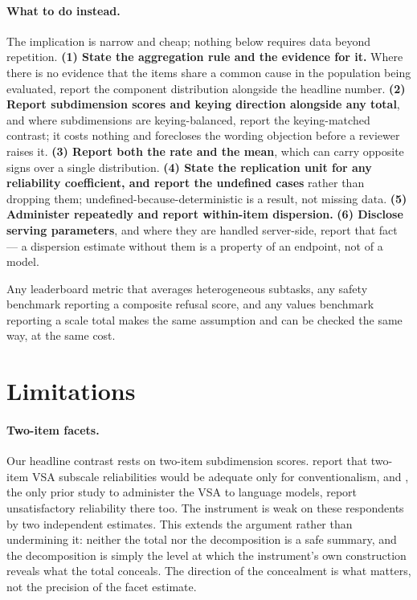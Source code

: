 \documentclass{article}
\begin{document}
\paragraph{What to do instead.} The implication is narrow and cheap; nothing below requires data beyond repetition. \textbf{(1) State the aggregation rule and the evidence for it.} Where there is no evidence that the items share a common cause in the population being evaluated, report the component distribution alongside the headline number. \textbf{(2) Report subdimension scores and keying direction alongside any total}, and where subdimensions are keying-balanced, report the keying-matched contrast; it costs nothing and forecloses the wording objection before a reviewer raises it. \textbf{(3) Report both the rate and the mean}, which can carry opposite signs over a single distribution. \textbf{(4) State the replication unit for any reliability coefficient, and report the undefined cases} rather than dropping them; undefined-because-deterministic is a result, not missing data. \textbf{(5) Administer repeatedly and report within-item dispersion.} \textbf{(6) Disclose serving parameters}, and where they are handled server-side, report that fact --- a dispersion estimate without them is a property of an endpoint, not of a model.

Any leaderboard metric that averages heterogeneous subtasks, any safety benchmark reporting a composite refusal score, and any values benchmark reporting a scale total makes the same assumption and can be checked the same way, at the same cost.

\section{Limitations}
\label{sec:limitations}

\paragraph{Two-item facets.} Our headline contrast rests on two-item subdimension scores. \citet{bizumic2018} report that two-item VSA subscale reliabilities would be adequate only for conventionalism, and \citet{einwiller2026}, the only prior study to administer the VSA to language models, report unsatisfactory reliability there too. The instrument is weak on these respondents by two independent estimates. This extends the argument rather than undermining it: neither the total nor the decomposition is a safe summary, and the decomposition is simply the level at which the instrument's own construction reveals what the total conceals. The direction of the concealment is what matters, not the precision of the facet estimate.
\end{document}
